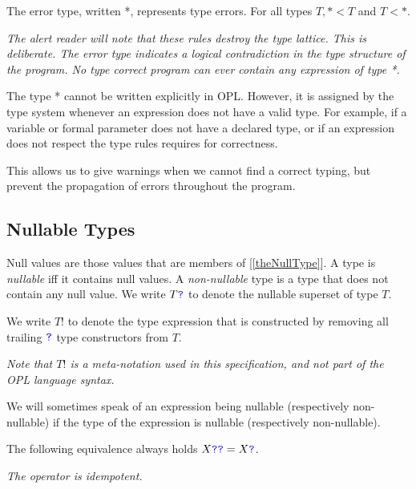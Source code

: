 \documentclass{article}
\begin{document}
{The error type, written *,  represents type errors. For all types $T, * < T$ and $T < *$.

{\em 
 The alert reader will note that these  rules destroy the type lattice. This is deliberate. The error type indicates a logical contradiction in the type structure of the program. No type correct program can ever contain any expression of  type *. 

The type * cannot be written explicitly in OPL. However, it is assigned by the type system whenever an expression does not have a valid type. For example, if a variable or formal parameter does not have a declared type, or if an expression does not respect the type rules requires for correctness.

This allows us to give warnings when we cannot find a correct typing, but prevent the propagation of errors throughout the program.
}

\subsection{Nullable Types}
\label{nullableTypes}

Null values are those values that are members of \NULLTYPE{} [\ref{theNullType}].  A type is {\em nullable} iff it contains null values.  A {\em non-nullable} type is a type that does not contain any null value.  We write  $T\texttt{\color{blue} ?}{}$ to denote the nullable superset of type $T$.

We write $T!$ to denote the type expression that is constructed by removing all trailing $\texttt{\color{blue} ?}{}$ type constructors from $T$. 

{\em Note that $T!$ is a meta-notation used in this specification, and not part of the OPL language syntax.}


We will sometimes speak of an expression being nullable (respectively non-nullable) if the type of the expression is nullable (respectively non-nullable).

The following equivalence always holds $X\texttt{\color{blue} ?}\texttt{\color{blue} ?}= X\texttt{\color{blue} ?}$.

{\em The \QUESTIONMARK{} operator is idempotent.}


}
\end{document}
